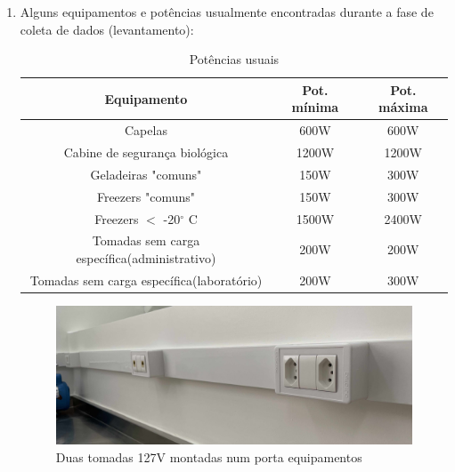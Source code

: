 \begin{enumerate}
	\item Alguns equipamentos e potências usualmente encontradas durante a fase de coleta de dados (levantamento):
		\begin{table}[ht]
			\centering
			\caption{Potências usuais}
			\begin{tabular}[t]{ccc}
				\toprule
				\color{Tue-red}\textbf{Equipamento}&\color{Tue-red}\textbf{Pot. mínima}&\color{Tue-red}\textbf{Pot. máxima}\\
				\midrule
				Capelas&600W&600W\\
				Cabine de segurança biológica&1200W&1200W\\
				Geladeiras "comuns"&150W&300W\\
				Freezers "comuns"&150W&300W\\
				Freezers $<$ -20$^{\circ}$ C&1500W&2400W\\
				Tomadas sem carga específica(administrativo)&200W&200W\\
				Tomadas sem carga específica(laboratório)&200W&300W\\
				\bottomrule
			\end{tabular}
			\label{table: potencias}
		\end{table}

	\begin{figure}[H]
		\includegraphics[width=\linewidth]{Figures/4. Socket/tomada1.jpg}
		\caption{Duas tomadas 127V montadas num porta equipamentos}
		\label{fig: tomada rodameio}
	\end{figure}
	\end{enumerate}
